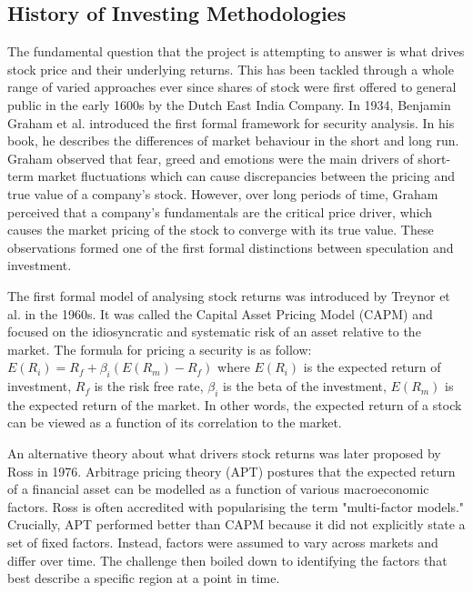 \documentclass[10pt,onecolumn,letterpaper]{article}
\begin{document}
\subsection{History of Investing Methodologies}  \label{History of Investing Methodologies}
The fundamental question that the project is attempting to answer is what drives stock price and their underlying returns. This has been tackled through a whole range of varied approaches ever since shares of stock were first offered to general public in the early 1600s by the Dutch East India Company\cite{Rouwenhorst}. In 1934, Benjamin Graham et al. introduced the first formal framework for security analysis\cite{Graham}. In his book, he describes the differences of market behaviour in the short and long run. Graham observed that fear, greed and emotions were the main drivers of short-term market fluctuations which can cause discrepancies between the pricing and true value of a company's stock. However, over long periods of time, Graham perceived that a company's fundamentals are the critical price driver, which causes the market pricing of the stock to converge with its true value. These observations formed one of the first formal distinctions between speculation and investment.

The first formal model\cite{Treynor} of analysing stock returns was introduced by Treynor et al. in the 1960s. It was called the Capital Asset Pricing Model (CAPM) and focused on the idiosyncratic and systematic risk of an asset relative to the market. The formula for pricing a security is as follow: $E(R_{i}) = R_{f} + \beta_{i}(E(R_{m}) - R_{f}) $ where $E(R_{i})$ is the expected return of investment, $R_{f}$ is the risk free rate, $\beta_{i}$ is the beta of the investment, $E(R_{m})$ is the expected return of the market. In other words, the expected return of a stock can be viewed as a function of its correlation to the market. 

An alternative theory\cite{Ross} about what drivers stock returns was later proposed by Ross in 1976. Arbitrage pricing theory (APT) postures that the expected return of a financial asset can be modelled as a function of various macroeconomic factors. Ross is often accredited with popularising the term "multi-factor models." Crucially, APT performed better than CAPM because it did not explicitly state a set of fixed factors. Instead, factors were assumed to vary across markets and differ over time. The challenge then boiled down to identifying the factors that best describe a specific region at a point in time. 
\end{document}
